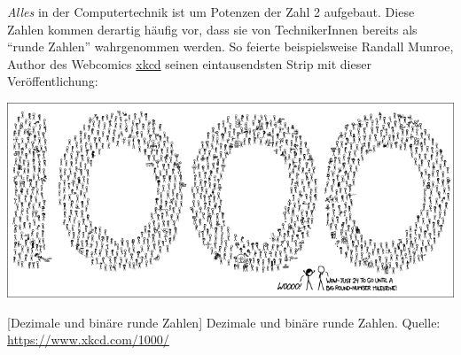 \begin{hintbox}
\emph{Alles} in der Computertechnik ist um Potenzen der Zahl 2 aufgebaut.
Diese Zahlen kommen derartig häufig vor, dass sie von TechnikerInnen bereits als \enquote{runde Zahlen} wahrgenommen werden. So feierte beispielsweise Randall Munroe, Author des Webcomics \href{https://www.xkcd.com/}{xkcd} seinen eintausendsten Strip mit dieser Veröffentlichung:

\begin{center}
\includegraphics[width=.9\linewidth]{./gfx/xkcd-1000}
\end{center}
	[Dezimale und binäre runde Zahlen]
	{Dezimale und binäre runde Zahlen. Quelle: \url{https://www.xkcd.com/1000/}}
\end{hintbox}
